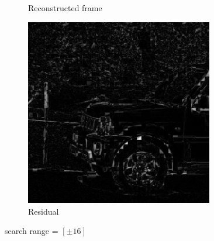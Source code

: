 \documentclass{homework}
\begin{document}
\begin{figure}[H]
\begin{subfigure}{0.32\textwidth}
        \caption{Reconstructed frame}
    \end{subfigure}
    \begin{subfigure}{0.32\textwidth}
        \centering
        \includegraphics[width=0.9\textwidth]{8_16_TSS_residual.png}
        \caption{Residual}
    \end{subfigure}
    \caption{search range = $[\pm 16]$}
\end{figure}
\end{document}
